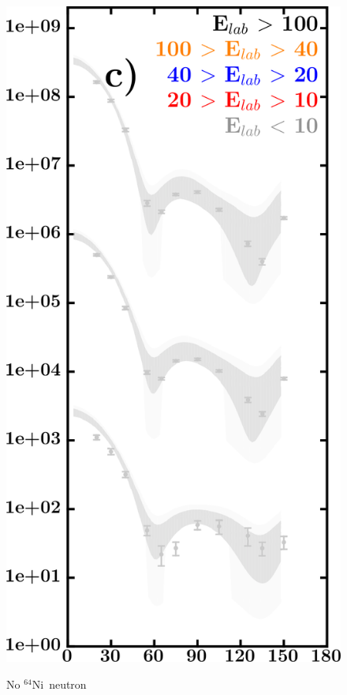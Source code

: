 \documentclass[twocolumn,secnumarabic,amssymb, nobibnotes, aps, prl,
superscriptaddress, nobalancelastpage, draft]{revtex4}
\newcommand{\niFour}{\ensuremath{^{64}}N\lowercase{i}}
\begin{document}
\begin{figure}[!htb]
\begin{minipage}{0.4\linewidth}
\begin{minipage}[c]{0.5\linewidth}
                \includegraphics[width=\linewidth]{figures/ni64_neutronElastic.png}
        \end{minipage}
        \begin{minipage}[c]{0.45\linewidth}
            \centering
            No \niFour\ neutron \\

\end{minipage}
\end{minipage}
\end{figure}
\end{document}
